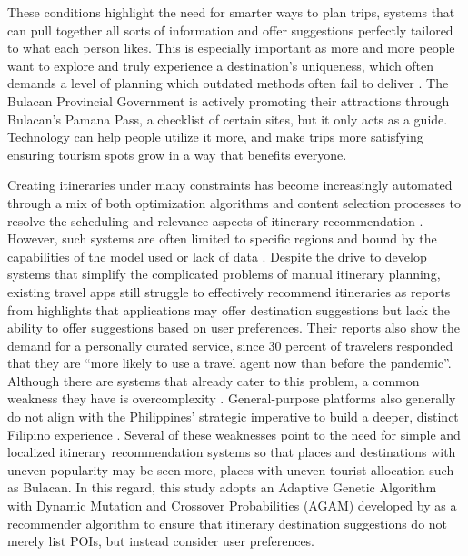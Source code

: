 These conditions highlight the need for smarter ways to plan trips, systems that can pull together all sorts of information and offer suggestions perfectly tailored to what each person likes. This is especially important as more and more people want to explore and truly experience a destination’s uniqueness, which often demands a level of planning which outdated methods often fail to deliver \parencite{Halder2022}. The Bulacan Provincial Government is actively promoting their attractions through Bulacan’s Pamana Pass, a checklist of certain sites, but it only acts as a guide. Technology can help people utilize it more, and make trips more satisfying ensuring tourism spots grow in a way that benefits everyone.

Creating itineraries under many constraints has become increasingly automated through a mix of both optimization algorithms and content selection processes to resolve the scheduling and relevance aspects of itinerary recommendation \parencite{Jewpanya2025,Liu2024}. However, such systems are often limited to specific regions and bound by the capabilities of the model used or lack of data \parencite{Cui2025,papadakis2024,Yulfihani2024}. Despite the drive to develop systems that simplify the complicated problems of manual itinerary planning, existing travel apps still struggle to effectively recommend itineraries as reports from \textcite{SkiftState2022} highlights that applications may offer destination suggestions but lack the ability to offer suggestions based on user preferences. Their reports also show the demand for a personally curated service, since 30 percent of travelers responded that they are “more likely to use a travel agent now than before the pandemic”. Although there are systems that already cater to this problem, a common weakness they have is overcomplexity \parencite{Postnikova2024}. General-purpose platforms also generally do not align with the Philippines’ strategic imperative to build a deeper, distinct Filipino experience \parencite{SkiftState2022,DOT2023}. Several of these weaknesses point to the need for simple and localized itinerary recommendation systems so that places and destinations with uneven popularity may be seen more, places with uneven tourist allocation such as Bulacan. In this regard, this study adopts an Adaptive Genetic Algorithm with Dynamic Mutation and Crossover Probabilities (AGAM)
developed by \parencite{Yochum2020} as a recommender algorithm to ensure that itinerary destination suggestions do not merely list POIs, but instead consider user preferences.


